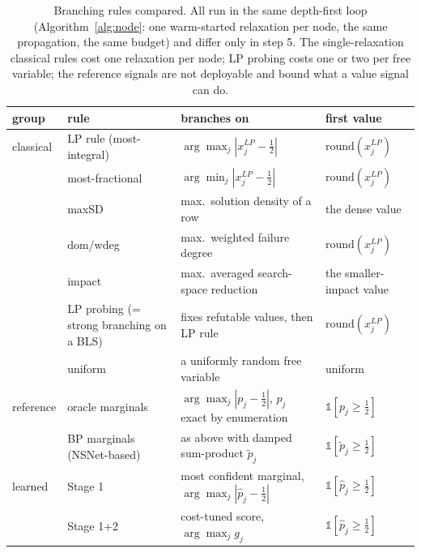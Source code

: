 \documentclass[final,5p,times,twocolumn,authoryear]{elsarticle}
\begin{document}
\begin{table}[t]
\centering
\caption{Branching rules compared. All run in the same depth-first loop (Algorithm~\ref{alg:node}: one warm-started relaxation per node, the same propagation, the same budget) and differ only in step 5. The single-relaxation classical rules cost one relaxation per node; LP probing costs one or two per free variable; the reference signals are not deployable and bound what a value signal can do.}
\label{tab:arms}
\small\begin{tabular}{llll}
\toprule
group & rule & branches on & first value \\
\midrule
classical & LP rule (most-integral) & $\arg\max_j|x^{LP}_j-\tfrac12|$ & $\mathrm{round}(x^{LP}_j)$ \\
& most-fractional & $\arg\min_j|x^{LP}_j-\tfrac12|$ & $\mathrm{round}(x^{LP}_j)$ \\
& maxSD \citep{pesant2012counting} & max.\ solution density of a row & the dense value \\
& dom/wdeg \citep{boussemart2004boosting} & max.\ weighted failure degree & $\mathrm{round}(x^{LP}_j)$ \\
& impact \citep{refalo2004impact} & max.\ averaged search-space reduction & the smaller-impact value \\
& LP probing (= strong branching on a BLS) & fixes refutable values, then LP rule & $\mathrm{round}(x^{LP}_j)$ \\
& uniform & a uniformly random free variable & uniform \\
\midrule
reference & oracle marginals & $\arg\max_j|p_j-\tfrac12|$, $p_j$ exact by enumeration & $\mathbb{1}[p_j\ge\tfrac12]$ \\
& BP marginals (NSNet-based) & as above with damped sum-product $\tilde p_j$ & $\mathbb{1}[\tilde p_j\ge\tfrac12]$ \\
\midrule
learned & Stage 1 & most confident marginal, $\arg\max_j|\hat p_j-\tfrac12|$ & $\mathbb{1}[\hat p_j\ge\tfrac12]$ \\
& Stage 1+2 & cost-tuned score, $\arg\max_j g_j$ & $\mathbb{1}[\hat p_j\ge\tfrac12]$ \\
\bottomrule
\end{tabular}
\end{table}
\end{document}

